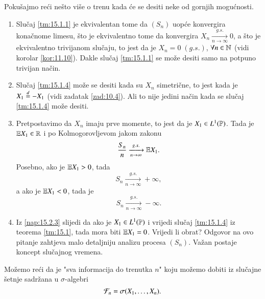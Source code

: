 \begin{nap} \label{nap:15.2}
    Poku\v sajmo re\' ci ne\v sto vi\v se o trenu kada \' ce se desiti neke od gornjih mogu\' cnosti.
    \begin{enumerate}[label=(\alph*)]
        \item Slu\v caj \ref{tm:15.1.1} je ekvivalentan tome da $(S_n)$ uop\' ce konvergira kona\v cnome limesu, \v sto je ekvivalentno tome da konvergira $X_n \xrightarrow[n \to \infty]{g.s.} 0$, a \v sto je ekvivalentno trivijanom slu\v caju, to jest da je $X_n = 0 \; (g.s.)$, $\forall n \in \mathbb{N}$ (vidi korolar \ref{kor:11.10}).
        Dakle slu\v caj \ref{tm:15.1.1} se mo\v ze desiti samo na potpuno trivijan na\v cin.
        \item Slu\v caj \ref{tm:15.1.4} mo\v ze se desiti kada su $X_n$ simetri\v cne, to jest kada je $X_1 \overset{d}{=} - X_1$ (vidi zadatak \ref{zad:10.4}).
        Ali to nije jedini na\v cin kada se slu\v caj \ref{tm:15.1.4} mo\v ze desiti.
        \item \label{nap:15.2.3}
        Pretpostavimo da $X_n$ imaju prve momente, to jest da je $X_1 \in L^1(\mathbb{P})$.
        Tada je $\mathbb{E} X_1 \in \mathbb{R}$ i po Kolmogorovljevom jakom zakonu
        \begin{equation*}
            \frac{S_n}{n} \xrightarrow[n \to \infty]{g.s.} \mathbb{E} X_1.
        \end{equation*}
        Posebno, ako je $\mathbb{E} X_1 > 0$, tada
        \begin{equation*}
            S_n \xrightarrow[n \to \infty]{g.s.} +\infty,
        \end{equation*}
        a ako je $\mathbb{E} X_1 < 0$, tada je
        \begin{equation*}
            S_n \xrightarrow[n \to \infty]{g.s.} - \infty.
        \end{equation*}
        \item Iz \ref{nap:15.2.3} slijedi da ako je $X_1 \in L^1 (\mathbb{P})$ i vrijedi slu\v caj \ref{tm:15.1.4} iz teorema \ref{tm:15.1}, tada mora biti $\mathbb{E} X_1 = 0$.
        Vrijedi li obrat?
        Odgovor na ovo pitanje zahtjeva malo detaljniju analizu procesa $(S_n)$.
        Va\v zan postaje koncept slu\v cajnog vremena.
    \end{enumerate}
\end{nap}

Mo\v zemo re\' ci da je "sva informacija do trenutka $n$" koju mo\v zemo dobiti iz slu\v cajne \v setnje sadr\v zana u $\sigma$-algebri
\begin{equation*}
    \mathcal{F}_n = \sigma({X_1, \ldots, X_n}).
\end{equation*}

